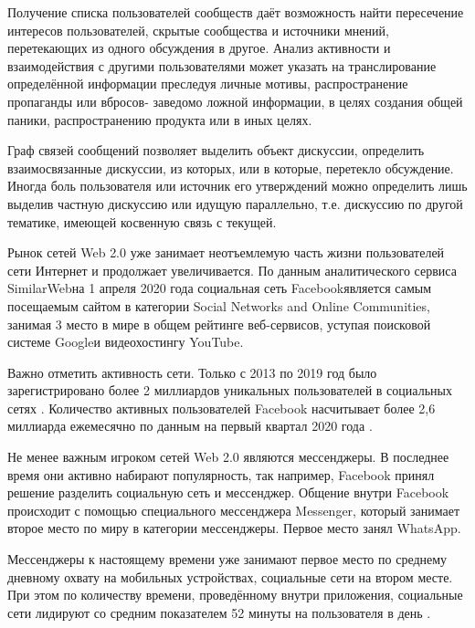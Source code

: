 \documentclass[a4paper,article,14pt]{extarticle}
\begin{document}
	Получение списка пользователей сообществ даёт возможность найти пересечение интересов пользователей, скрытые сообщества и источники мнений, перетекающих из одного обсуждения в другое. Анализ активности и взаимодействия с другими пользователями может указать на транслирование определённой информации преследуя личные мотивы, распространение пропаганды или \flqq вбросов\frqq - заведомо ложной информации, в целях создания общей паники, распространению продукта или в иных целях.

	Граф связей сообщений позволяет выделить объект дискуссии, определить взаимосвязанные дискуссии, из которых, или в которые, перетекло обсуждение. Иногда боль пользователя или источник его утверждений можно определить лишь выделив частную дискуссию или идущую параллельно, т.е. дискуссию по другой тематике, имеющей косвенную связь с текущей.


	Рынок сетей Web 2.0 уже занимает неотъемлемую часть жизни пользователей сети Интернет и продолжает увеличивается. По данным аналитического сервиса \flqq SimilarWeb\frqq на 1 апреля 2020 года социальная сеть \flqq Facebook\frqq является самым посещаемым сайтом в категории \flqq Social Networks and Online Communities\frqq, занимая 3 место в мире в общем рейтинге веб-сервисов, уступая поисковой системе \flqq Google\frqq и видеохостингу \flqq YouTube\frqq \cite{cite5}.

	Важно отметить активность сети. Только с 2013 по 2019 год было зарегистрировано более 2 миллиардов уникальных пользователей в социальных сетях \cite{cite1}. Количество активных пользователей Facebook насчитывает более 2,6 миллиарда ежемесячно по данным на первый квартал 2020 года \cite{cite2}.

	Не менее важным игроком сетей Web 2.0 являются мессенджеры. В последнее время они активно набирают популярность, так например, Facebook принял решение разделить социальную сеть и мессенджер. Общение внутри Facebook происходит с помощью специального мессенджера \flqq Messenger\frqq, который занимает второе место по миру в категории \flqq мессенджеры\frqq. Первое место занял \flqq WhatsApp\frqq.

	Мессенджеры к настоящему времени уже занимают первое место по среднему дневному охвату на мобильных устройствах, социальные сети на втором месте. При этом по количеству времени, проведённому внутри приложения, социальные сети лидируют со средним показателем 52 минуты на пользователя в день \cite{cite6}.
\end{document}
